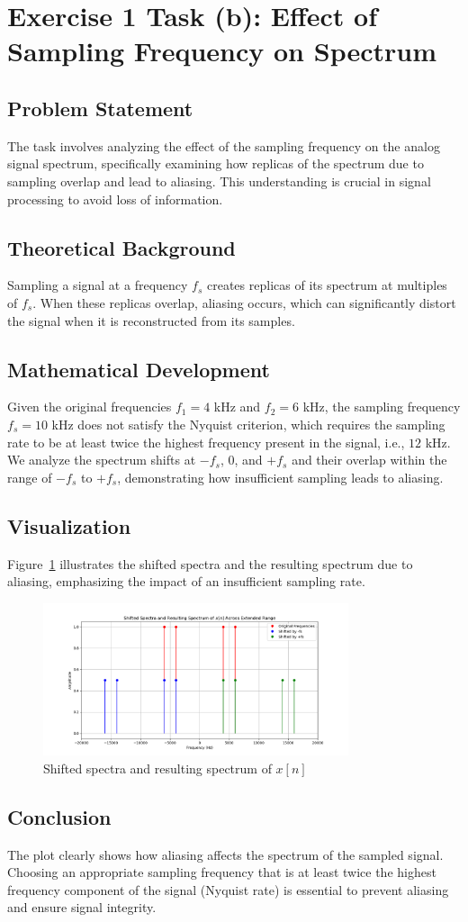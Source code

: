 \item[(b)]
\section*{Exercise 1 Task (b): Effect of Sampling Frequency on Spectrum}

\subsection*{Problem Statement}
The task involves analyzing the effect of the sampling frequency on the analog signal spectrum, specifically examining how replicas of the spectrum due to sampling overlap and lead to aliasing. This understanding is crucial in signal processing to avoid loss of information.

\subsection*{Theoretical Background}
Sampling a signal at a frequency $f_s$ creates replicas of its spectrum at multiples of $f_s$. When these replicas overlap, aliasing occurs, which can significantly distort the signal when it is reconstructed from its samples.

\subsection*{Mathematical Development}
Given the original frequencies $f_1 = 4$ kHz and $f_2 = 6$ kHz, the sampling frequency $f_s = 10$ kHz does not satisfy the Nyquist criterion, which requires the sampling rate to be at least twice the highest frequency present in the signal, i.e., $12$ kHz. We analyze the spectrum shifts at $-f_s$, $0$, and $+f_s$ and their overlap within the range of $-f_s$ to $+f_s$, demonstrating how insufficient sampling leads to aliasing.

\subsection*{Visualization}
Figure~\ref{fig:ex1b_spectrum} illustrates the shifted spectra and the resulting spectrum due to aliasing, emphasizing the impact of an insufficient sampling rate.

\begin{figure}[h]
    \centering
    \includegraphics[width=0.8\textwidth]{fig/ex1_b_plot}
    \caption{Shifted spectra and resulting spectrum of $x[n]$}
    \label{fig:ex1b_spectrum}
\end{figure}

\subsection*{Conclusion}
The plot clearly shows how aliasing affects the spectrum of the sampled signal. Choosing an appropriate sampling frequency that is at least twice the highest frequency component of the signal (Nyquist rate) is essential to prevent aliasing and ensure signal integrity.
